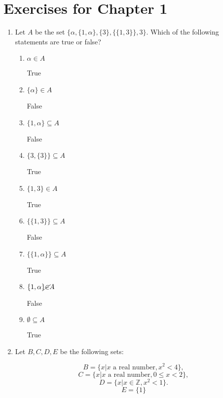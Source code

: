 \documentclass{article}
\begin{document}
	\section*{Exercises for Chapter 1}
	
	\begin{enumerate}
		\item Let $A$ be the set $\{ \alpha , \{ 1, \alpha \}, \{ 3 \}, \{\{ 1, 3 \} \}, 3 \}$. Which of the following
		statements are true or false?
		
		\begin{enumerate}
			\item $\alpha \in A$
			
				True
				
			\item $\{ \alpha \} \in A$
			
				False
				
			\item $\{ 1, \alpha \} \subseteq A$ 
			
				False
				
			\item $\{ 3, \{3\} \} \subseteq A$
			
				True
				
			\item $\{ 1, 3 \} \in A$
			
				True
				
			\item $\{\{1, 3\} \} \subseteq A$
			
				False
				
			\item $\{\{1, \alpha \}\} \subseteq A$
			
				True
				
			\item $\{1, \alpha \} \cancel{ \in } A$
			
				False
				
			\item $\emptyset \subseteq A$
			
				True
		\end{enumerate}
		
		\item Let $B, C, D, E$ be the following sets:
		
			$$B  = \{x | x \text{ a real number}, x^2 < 4 \} ,$$
			$$C = \{x | x \text{ a real number}, 0 \leq x < 2 \},$$
			$$D = \{x | x \in \mathbb{Z}, x^2 < 1 \}. $$
			$$E = \{ 1 \}$$
			
		\begin{enumerate}
		

\end{enumerate}
\end{enumerate}
\end{document}
